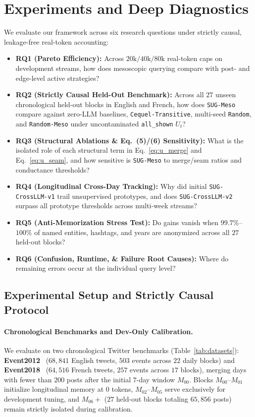 \section{Experiments and Deep Diagnostics}
\label{sec:experiments}

We evaluate our framework across six research questions under strictly causal, leakage-free real-token accounting:
\begin{itemize}
    \item \textbf{RQ1 (Pareto Efficiency):} Across $20\text{k}/40\text{k}/80\text{k}$ real-token caps on development streams, how does mesoscopic querying compare with post- and edge-level active strategies?
    \item \textbf{RQ2 (Strictly Causal Held-Out Benchmark):} Across all $27$ unseen chronological held-out blocks in English and French, how does \texttt{SUG-Meso} compare against zero-LLM baselines, \texttt{Cequel-Transitive}, multi-seed \texttt{Random}, and \texttt{Random-Meso} under uncontaminated \texttt{all\_shown} $U_t$?
    \item \textbf{RQ3 (Structural Ablations \& Eq.~(5)/(6) Sensitivity):} What is the isolated role of each structural term in Eq.~\eqref{eq:u_merge} and Eq.~\eqref{eq:u_seam}, and how sensitive is \texttt{SUG-Meso} to merge/seam ratios and conductance thresholds?
    \item \textbf{RQ4 (Longitudinal Cross-Day Tracking):} Why did initial \texttt{SUG-CrossLLM-v1} trail unsupervised prototypes, and does \texttt{SUG-CrossLLM-v2} surpass all prototype thresholds across multi-week streams?
    \item \textbf{RQ5 (Anti-Memorization Stress Test):} Do gains vanish when $99.7\%$--$100\%$ of named entities, hashtags, and years are anonymized across all $27$ held-out blocks?
    \item \textbf{RQ6 (Confusion, Runtime, \& Failure Root Causes):} Where do remaining errors occur at the individual query level?
\end{itemize}

\subsection{Experimental Setup and Strictly Causal Protocol}
\label{sec:setup}

\paragraph{Chronological Benchmarks and Dev-Only Calibration.}
We evaluate on two chronological Twitter benchmarks (Table~\ref{tab:datasets}): \textbf{Event2012}~\citep{mcminn2013building} ($68{,}841$ English tweets, $503$ events across $22$ daily blocks) and \textbf{Event2018}~\citep{mazoyer2020french} ($64{,}516$ French tweets, $257$ events across $17$ blocks), merging days with fewer than $200$ posts after the initial $7$-day window $M_{00}$. Blocks $M_{00}$--$M_{01}$ initialize longitudinal memory at $0$ tokens, $M_{02}$--$M_{05}$ serve exclusively for development tuning, and $M_{06}+$ ($27$ held-out blocks totaling $65{,}856$ posts) remain strictly isolated during calibration.

